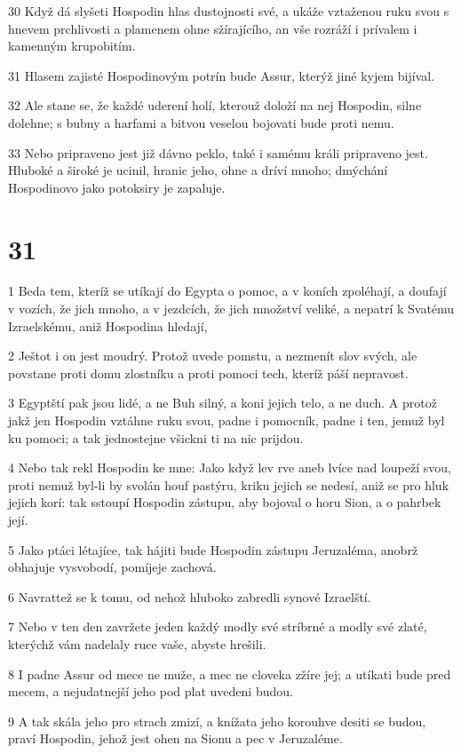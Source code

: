 \par 30 Když dá slyšeti Hospodin hlas dustojnosti své, a ukáže vztaženou ruku svou s hnevem prchlivosti a plamenem ohne sžírajícího, an vše rozráží i prívalem i kamenným krupobitím.
\par 31 Hlasem zajisté Hospodinovým potrín bude Assur, kterýž jiné kyjem bijíval.
\par 32 Ale stane se, že každé uderení holí, kterouž doloží na nej Hospodin, silne dolehne; s bubny a harfami a bitvou veselou bojovati bude proti nemu.
\par 33 Nebo pripraveno jest již dávno peklo, také i samému králi pripraveno jest. Hluboké a široké je ucinil, hranic jeho, ohne a dríví mnoho; dmýchání Hospodinovo jako potoksiry je zapaluje.

\chapter{31}

\par 1 Beda tem, kteríž se utíkají do Egypta o pomoc, a v koních zpoléhají, a doufají v vozích, že jich mnoho, a v jezdcích, že jich množství veliké, a nepatrí k Svatému Izraelskému, aniž Hospodina hledají,
\par 2 Ještot i on jest moudrý. Protož uvede pomstu, a nezmenít slov svých, ale povstane proti domu zlostníku a proti pomoci tech, kteríž páší nepravost.
\par 3 Egyptští pak jsou lidé, a ne Buh silný, a koni jejich telo, a ne duch. A protož jakž jen Hospodin vztáhne ruku svou, padne i pomocník, padne i ten, jemuž byl ku pomoci; a tak jednostejne všickni ti na nic prijdou.
\par 4 Nebo tak rekl Hospodin ke mne: Jako když lev rve aneb lvíce nad loupeží svou, proti nemuž byl-li by svolán houf pastýru, kriku jejich se nedesí, aniž se pro hluk jejich korí: tak sstoupí Hospodin zástupu, aby bojoval o horu Sion, a o pahrbek její.
\par 5 Jako ptáci létajíce, tak hájiti bude Hospodin zástupu Jeruzaléma, anobrž obhajuje vysvobodí, pomíjeje zachová.
\par 6 Navrattež se k tomu, od nehož hluboko zabredli synové Izraelští.
\par 7 Nebo v ten den zavržete jeden každý modly své stríbrné a modly své zlaté, kterýchž vám nadelaly ruce vaše, abyste hrešili.
\par 8 I padne Assur od mece ne muže, a mec ne cloveka zžíre jej; a utíkati bude pred mecem, a nejudatnejší jeho pod plat uvedeni budou.
\par 9 A tak skála jeho pro strach zmizí, a knížata jeho korouhve desiti se budou, praví Hospodin, jehož jest ohen na Sionu a pec v Jeruzaléme.

